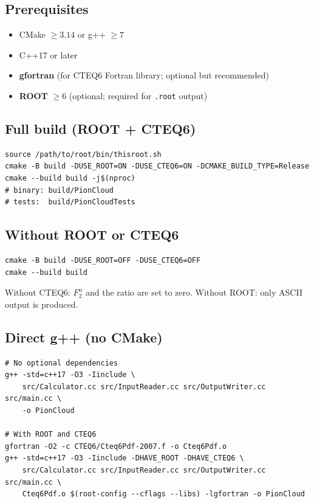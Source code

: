 \documentclass[11pt,a4paper]{article}
\begin{document}
\subsection{Prerequisites}

\begin{itemize}
\item CMake $\geq 3.14$ or g++ $\geq 7$
\item C++17 or later
\item \textbf{gfortran} (for CTEQ6 Fortran library; optional but recommended)
\item \textbf{ROOT} $\geq 6$ (optional; required for \texttt{.root} output)
\end{itemize}

\subsection{Full build (ROOT + CTEQ6)}

\begin{lstlisting}[style=bashstyle]
source /path/to/root/bin/thisroot.sh
cmake -B build -DUSE_ROOT=ON -DUSE_CTEQ6=ON -DCMAKE_BUILD_TYPE=Release
cmake --build build -j$(nproc)
# binary: build/PionCloud
# tests:  build/PionCloudTests
\end{lstlisting}

\subsection{Without ROOT or CTEQ6}

\begin{lstlisting}[style=bashstyle]
cmake -B build -DUSE_ROOT=OFF -DUSE_CTEQ6=OFF
cmake --build build
\end{lstlisting}

Without CTEQ6: $F_2^n$ and the ratio are set to zero.
Without ROOT: only ASCII output is produced.

\subsection{Direct g++ (no CMake)}

\begin{lstlisting}[style=bashstyle]
# No optional dependencies
g++ -std=c++17 -O3 -Iinclude \
    src/Calculator.cc src/InputReader.cc src/OutputWriter.cc src/main.cc \
    -o PionCloud

# With ROOT and CTEQ6
gfortran -O2 -c CTEQ6/Cteq6Pdf-2007.f -o Cteq6Pdf.o
g++ -std=c++17 -O3 -Iinclude -DHAVE_ROOT -DHAVE_CTEQ6 \
    src/Calculator.cc src/InputReader.cc src/OutputWriter.cc src/main.cc \
    Cteq6Pdf.o $(root-config --cflags --libs) -lgfortran -o PionCloud
\end{lstlisting}
\end{document}
